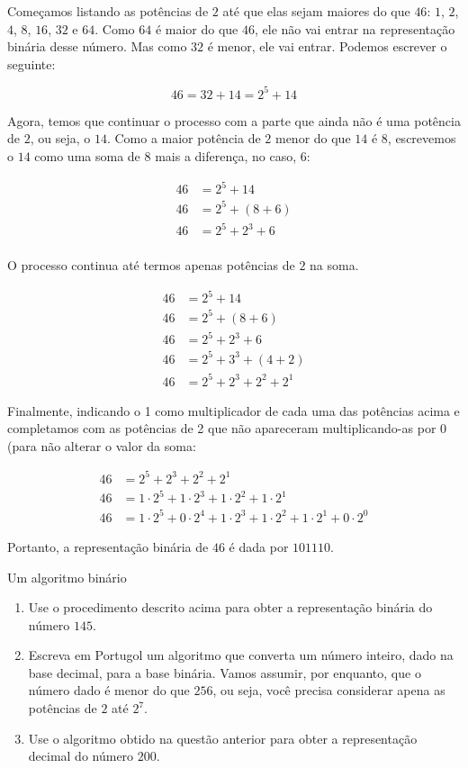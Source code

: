 Começamos listando as potências de $2$ até que elas sejam maiores do que $46$: $1$, $2$, $4$, $8$, $16$, $32$ e $64$. Como $64$ é maior do que $46$, ele não vai entrar na representação binária desse número. Mas como $32$ é menor, ele vai entrar. Podemos escrever o seguinte:

\begin{equation*}
46=32+14=2^5+14
\end{equation*}

Agora, temos que continuar o processo com a parte que ainda não é uma potência de $2$, ou seja, o $14$. Como a maior potência de $2$ menor do que $14$ é $8$, escrevemos o $14$ como uma soma de 8 mais a diferença, no caso, $6$:

\begin{align*}
46&=2^5+14 \\
46&=2^5+(8+6) \\
46&=2^5+2^3+6 \\
\end{align*}
 
O processo continua até termos apenas potências de $2$ na soma.

\begin{align*}
46&=2^5+14 \\
46&=2^5+(8+6) \\
46&=2^5+2^3+6 \\
46&=2^5+3^3+(4+2) \\
46&=2^5+2^3+2^2+2^1
\end{align*}
 
Finalmente, indicando o 1 como multiplicador de cada uma das potências acima e completamos com as potências de 2 que não apareceram multiplicando-as por 0 (para não alterar o valor da soma:

\begin{align*}
46&=2^5+2^3+2^2+2^1 \\
46&=1\cdot2^5+1\cdot2^3+1\cdot2^2+1\cdot2^1 \\
46&=1\cdot2^5+0\cdot2^4+1\cdot2^3+1\cdot2^2+1\cdot2^1+0\cdot2^0
\end{align*}
 
Portanto, a representação binária de $46$ é dada por $101110$.

\begin{task}{Um algoritmo binário}
\begin{enumerate}
\item Use o procedimento descrito acima para obter a representação binária do número $145$.

\item Escreva em Portugol um algoritmo que converta um número inteiro, dado na base decimal, para a base binária. Vamos assumir, por enquanto, que o número dado é menor do que $256$, ou seja, você precisa considerar apena as potências de $2$ até $2^7$.

\item Use o algoritmo obtido na questão anterior para obter a representação decimal do número $200$.
\end{enumerate}
\end{task}

